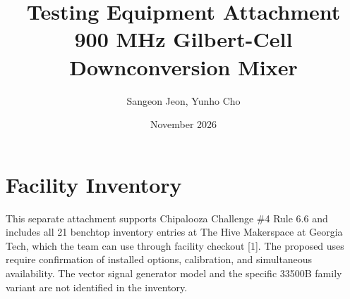 \documentclass[10pt,letterpaper]{article}
\title{\textbf{Testing Equipment Attachment}\\900 MHz Gilbert-Cell Downconversion Mixer}
\author{Sangeon Jeon, Yunho Cho}
\date{November 2026}
\begin{document}
\maketitle

\section{Facility Inventory}

This separate attachment supports Chipalooza Challenge \#4 Rule 6.6 and includes all 21 benchtop inventory entries at The Hive Makerspace at Georgia Tech, which the team can use through facility checkout [1].
The proposed uses require confirmation of installed options, calibration, and simultaneous availability.
The vector signal generator model and the specific 33500B family variant are not identified in the inventory.
\end{document}

